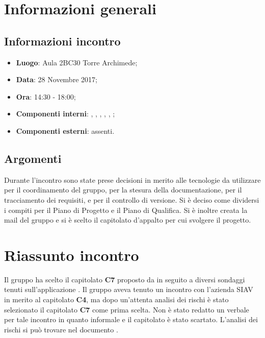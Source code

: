 \section{Informazioni generali}
\subsection{Informazioni incontro}
\begin{itemize}
\item \textbf{Luogo}: Aula 2BC30 Torre Archimede;
\item \textbf{Data}: 28 Novembre 2017;
\item \textbf{Ora}: 14:30 - 18:00;
\item \textbf{Componenti interni}: \Tommaso, \Carlo, \Mattia, \Luca, \Cristian, \Isacco;
\item \textbf{Componenti esterni}: assenti.
\end{itemize}

\subsection{Argomenti}
Durante l'incontro sono state prese decisioni in merito alle tecnologie da utilizzare per il coordinamento del gruppo, 
per la stesura della documentazione, per il tracciamento dei requisiti, e per il controllo di versione. Si è deciso come dividersi i compiti per il Piano di Progetto e il Piano di Qualifica. Si è inoltre creata la mail del gruppo e si è scelto 
il capitolato d'appalto per cui svolgere il progetto.

\section{Riassunto incontro}
Il gruppo ha scelto il capitolato \textbf{C7} \ProjectName{} proposto da \Proponente{} in seguito a diversi sondaggi tenuti 
sull'applicazione . Il gruppo aveva tenuto un incontro con l'azienda SIAV in merito al 
capitolato \textbf{C4}, ma dopo un'attenta analisi dei rischi è stato selezionato il capitolato \textbf{C7} come prima scelta.
Non è stato redatto un verbale per tale incontro in quanto informale e il capitolato è stato scartato.
L'analisi dei rischi si può trovare nel documento \StudioFattibilita.\\

